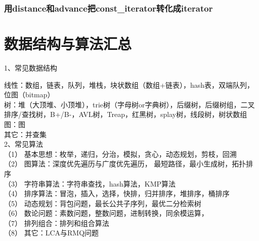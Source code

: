 \subsubsection{用distance和advance把const_iterator转化成iterator}

\section{数据结构与算法汇总}

1、常见数据结构

线性：数组，链表，队列，堆栈，块状数组（数组+链表），hash表，双端队列，位图（bitmap）\\
树：堆（大顶堆、小顶堆），trie树（字母树or字典树），后缀树，后缀树组，二叉排序/查找树，B+/B-，AVL树，Treap，红黑树，splay树，线段树，树状数组
图：图\\
其它：并查集\\

2、常见算法\\
（1）       基本思想：枚举，递归，分治，模拟，贪心，动态规划，剪枝，回溯\\
（2）       图算法：深度优先遍历与广度优先遍历， 最短路径，最小生成树，拓扑排序\\
（3）       字符串算法：字符串查找，hash算法，KMP算法\\
（4）       排序算法：冒泡，插入，选择，快排，归并排序，堆排序，桶排序\\
（5）       动态规划：背包问题，最长公共子序列，最优二分检索树\\
（6）       数论问题：素数问题，整数问题，进制转换，同余模运算，\\
（7）       排列组合：排列和组合算法\\
（8）       其它：LCA与RMQ问题